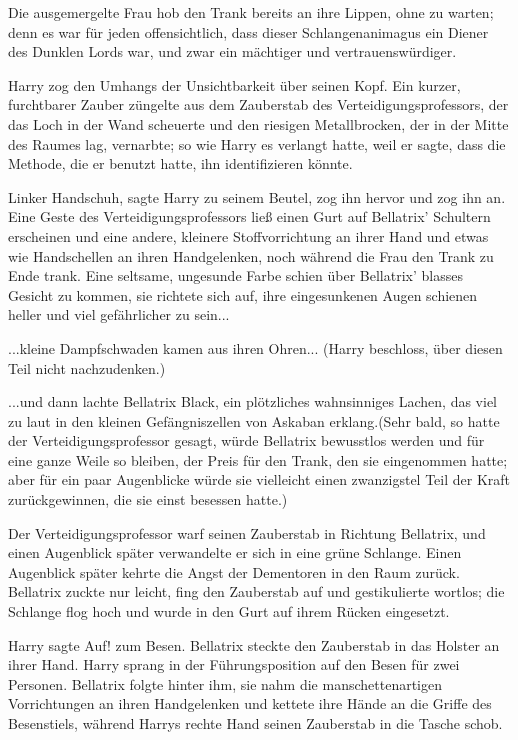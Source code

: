Die ausgemergelte Frau hob den Trank bereits an ihre Lippen, ohne zu warten;
denn es war für jeden offensichtlich, dass dieser Schlangenanimagus ein Diener
des Dunklen Lords war, und zwar ein mächtiger und vertrauenswürdiger.

Harry zog den Umhangs der Unsichtbarkeit über seinen Kopf. Ein kurzer,
furchtbarer Zauber züngelte aus dem Zauberstab des Verteidigungsprofessors, der
das Loch in der Wand scheuerte und den riesigen Metallbrocken, der in der Mitte
des Raumes lag, vernarbte; so wie Harry es verlangt hatte, weil er sagte, dass
die Methode, die er benutzt hatte, ihn identifizieren könnte.

\glqq Linker Handschuh\grqq{}, sagte Harry zu seinem Beutel, zog ihn hervor und
zog ihn an. Eine Geste des Verteidigungsprofessors ließ einen Gurt auf
Bellatrix' Schultern erscheinen und eine andere, kleinere Stoffvorrichtung an
ihrer Hand und etwas wie Handschellen an ihren Handgelenken, noch während die
Frau den Trank zu Ende trank. Eine seltsame, ungesunde Farbe schien über
Bellatrix' blasses Gesicht zu kommen, sie richtete sich auf, ihre eingesunkenen
Augen schienen heller und viel gefährlicher zu sein...

...kleine Dampfschwaden kamen aus ihren Ohren... (Harry beschloss, über diesen
Teil nicht nachzudenken.)

...und dann lachte Bellatrix Black, ein plötzliches wahnsinniges Lachen, das
viel zu laut in den kleinen Gefängniszellen von Askaban erklang.(Sehr bald, so
hatte der Verteidigungsprofessor gesagt, würde Bellatrix bewusstlos werden und
für eine ganze Weile so bleiben, der Preis für den Trank, den sie eingenommen
hatte; aber für ein paar Augenblicke würde sie vielleicht einen zwanzigstel Teil
der Kraft zurückgewinnen, die sie einst besessen hatte.)

Der Verteidigungsprofessor warf seinen Zauberstab in Richtung Bellatrix, und
einen Augenblick später verwandelte er sich in eine grüne Schlange. Einen
Augenblick später kehrte die Angst der Dementoren in den Raum zurück. Bellatrix
zuckte nur leicht, fing den Zauberstab auf und gestikulierte wortlos; die
Schlange flog hoch und wurde in den Gurt auf ihrem Rücken eingesetzt.

Harry sagte \glqq Auf!\grqq{} zum Besen. Bellatrix steckte den Zauberstab in das
Holster an ihrer Hand. Harry sprang in der Führungsposition auf den Besen für
zwei Personen. Bellatrix folgte hinter ihm, sie nahm die manschettenartigen
Vorrichtungen an ihren Handgelenken und kettete ihre Hände an die Griffe des
Besenstiels, während Harrys rechte Hand seinen Zauberstab in die Tasche schob.

